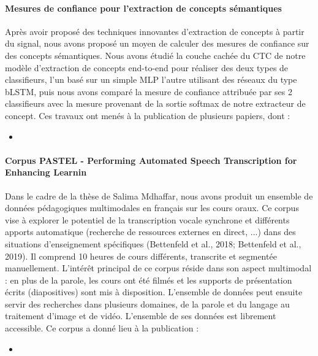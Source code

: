 \documentclass[11pt,a4paper]{article}
\begin{document}
\paragraph{Mesures de confiance pour l'extraction de concepts sémantiques} Après avoir proposé des techniques innovantes d'extraction de concepts à partir du signal, nous avons proposé un moyen de calculer des mesures de confiance sur des concepts sémantiques.  Nous avons étudié la couche cachée du CTC de notre modèle d'extraction de concepts end-to-end pour réaliser des deux types de classifieurs, l'un basé sur un simple MLP l'autre utilisant des réseaux du type bLSTM, puis nous avons comparé la mesure de confiance attribuée par ses 2 classifieurs avec la mesure provenant de la sortie softmax de notre extracteur de concept. Ces travaux ont menés à la publication de plusieurs papiers, dont :

\begin{itemize}
 \item {}
\end{itemize}

\paragraph{Corpus PASTEL - Performing Automated Speech Transcription for Enhancing Learnin} Dans le cadre de la thèse de Salima Mdhaffar, nous avons produit un ensemble de données pédagogiques multimodales en français sur les cours oraux. Ce corpus vise à explorer le potentiel de la transcription vocale synchrone et différents apports automatique (recherche de ressources externes en direct, ...) dans des situations d'enseignement spécifiques (Bettenfeld et al., 2018; Bettenfeld et al., 2019). Il comprend 10 heures de cours différents, transcrite et segmentée manuellement. L'intérêt principal de ce corpus réside dans son aspect multimodal : en plus de la parole, les cours ont été filmés et les supports de présentation écrits (diapositives) sont mis à disposition. L'ensemble de données peut ensuite servir des recherches dans plusieurs domaines,
de la parole et du langage au traitement d'image et de vidéo. L'ensemble de ses données est librement accessible.
Ce corpus a donné lieu à la publication :

\begin{itemize}
	\item {}
\end{itemize}
\end{document}
